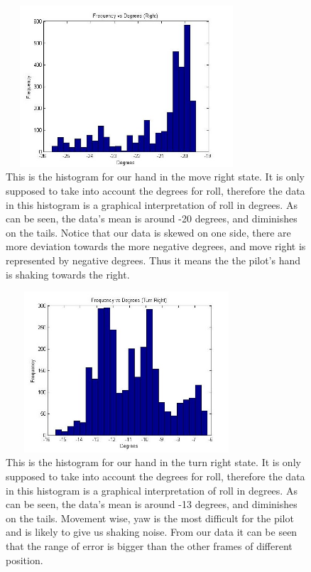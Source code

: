 \documentclass[letterpaper,english, 12pt]{article}
\begin{document}
\begin{figure}[H]
	\centering
	\includegraphics[height=6cm,width=90mm]{pics/rightHistogram1.jpg}
	\caption{This is the histogram for our hand in the move right state. It is only supposed to take into account the degrees for roll, therefore the data in this histogram is a graphical interpretation of roll in degrees.  As can be seen, the data's mean is around -20 degrees, and diminishes on the tails. Notice that our data is skewed on one side, there are more deviation towards the more negative degrees, and move right is represented by negative degrees.  Thus it means the the pilot's hand is shaking towards the right.}
\end{figure}

\begin{figure}[H]
	\centering
	\includegraphics[height=6cm,width=90mm]{pics/turnRightHistogram1.jpg}
	\caption{This is the histogram for our hand in the turn right state. It is only supposed to take into account the degrees for roll, therefore the data in this histogram is a graphical interpretation of roll in degrees.  As can be seen, the data's mean is around -13 degrees, and diminishes on the tails. Movement wise, yaw is the most difficult for the pilot and is likely to give us shaking noise.  From our data it can be seen that the range of error is bigger than the other frames of different position.}
\end{figure}
\end{document}
